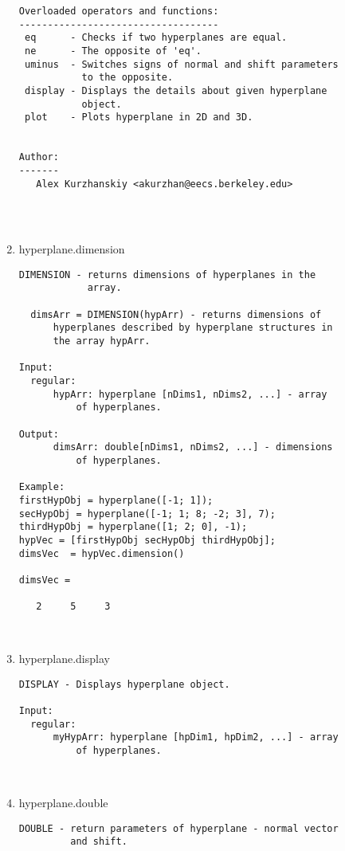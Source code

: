 \begin{enumerate}
\begin{lstlisting}
Overloaded operators and functions:
-----------------------------------
 eq      - Checks if two hyperplanes are equal.
 ne      - The opposite of 'eq'.
 uminus  - Switches signs of normal and shift parameters
           to the opposite.
 display - Displays the details about given hyperplane
           object.
 plot    - Plots hyperplane in 2D and 3D.


Author:
-------
   Alex Kurzhanskiy <akurzhan@eecs.berkeley.edu>




\end{lstlisting}
\fontfamily{\familydefault}
\selectfont
\item {hyperplane.dimension}
\selectfont
\begin{lstlisting}
DIMENSION - returns dimensions of hyperplanes in the
            array.

  dimsArr = DIMENSION(hypArr) - returns dimensions of
      hyperplanes described by hyperplane structures in
      the array hypArr.

Input:
  regular:
      hypArr: hyperplane [nDims1, nDims2, ...] - array
          of hyperplanes.

Output:
      dimsArr: double[nDims1, nDims2, ...] - dimensions
          of hyperplanes.

Example:
firstHypObj = hyperplane([-1; 1]);
secHypObj = hyperplane([-1; 1; 8; -2; 3], 7);
thirdHypObj = hyperplane([1; 2; 0], -1);
hypVec = [firstHypObj secHypObj thirdHypObj];
dimsVec  = hypVec.dimension()

dimsVec =

   2     5     3



\end{lstlisting}
\fontfamily{\familydefault}
\selectfont
\item {hyperplane.display}
\selectfont
\begin{lstlisting}
DISPLAY - Displays hyperplane object.

Input:
  regular:
      myHypArr: hyperplane [hpDim1, hpDim2, ...] - array
          of hyperplanes.



\end{lstlisting}
\fontfamily{\familydefault}
\selectfont
\item {hyperplane.double}
\selectfont
\begin{lstlisting}
DOUBLE - return parameters of hyperplane - normal vector
         and shift.


\end{lstlisting}
\end{enumerate}
